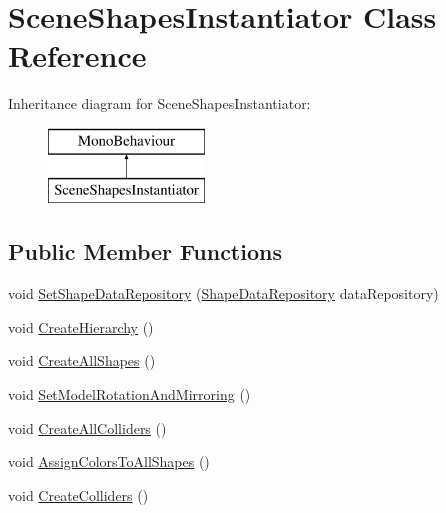 \hypertarget{class_scene_shapes_instantiator}{}\section{Scene\+Shapes\+Instantiator Class Reference}
\label{class_scene_shapes_instantiator}
Inheritance diagram for Scene\+Shapes\+Instantiator\+:\begin{figure}[H]
\begin{center}
\leavevmode
\includegraphics[height=2.000000cm]{class_scene_shapes_instantiator}
\end{center}
\end{figure}
\subsection*{Public Member Functions}
\begin{DoxyCompactItemize}
\item 
void \mbox{\hyperlink{class_scene_shapes_instantiator_a84a665ef8ad23ac0700377a8034818d0}{Set\+Shape\+Data\+Repository}} (\mbox{\hyperlink{class_shape_data_repository}{Shape\+Data\+Repository}} data\+Repository)
\item 
void \mbox{\hyperlink{class_scene_shapes_instantiator_a62e5a27617df3d1dd071d74365e197f1}{Create\+Hierarchy}} ()
\item 
void \mbox{\hyperlink{class_scene_shapes_instantiator_a65c7dea0e58715677f41651a4e4cbc08}{Create\+All\+Shapes}} ()
\item 
void \mbox{\hyperlink{class_scene_shapes_instantiator_ad5840900aadc513eb435105164c959d5}{Set\+Model\+Rotation\+And\+Mirroring}} ()
\item 
void \mbox{\hyperlink{class_scene_shapes_instantiator_a29c0c752b7e68cd04618f1e4de089df9}{Create\+All\+Colliders}} ()
\item 
void \mbox{\hyperlink{class_scene_shapes_instantiator_a3575e9b10cd0aa419f47977ef6dda3d2}{Assign\+Colors\+To\+All\+Shapes}} ()
\item 
void \mbox{\hyperlink{class_scene_shapes_instantiator_a39f8076e858d5c0b4b72253e07199553}{Create\+Colliders}} ()
\end{DoxyCompactItemize}
